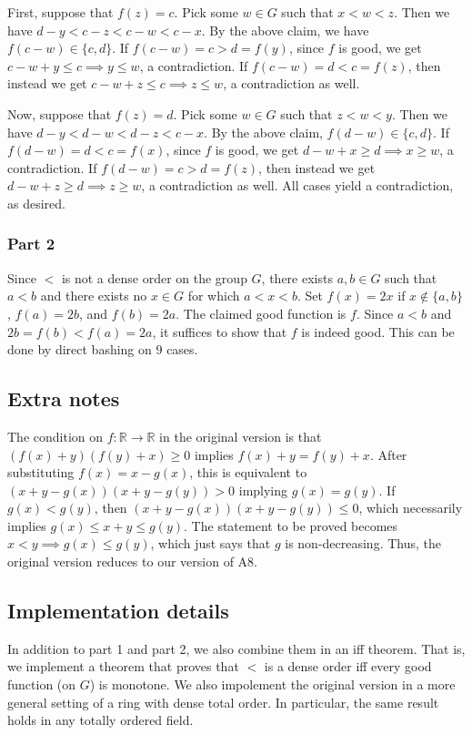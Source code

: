 \documentclass{article}
\newcommand{\R}{\mathbb{R}}
\begin{document}
First, suppose that $f(z) = c$.
Pick some $w \in G$ such that $x < w < z$.
Then we have $d - y < c - z < c - w < c - x$.
By the above claim, we have $f(c - w) \in \{c, d\}$.
If $f(c - w) = c > d = f(y)$, since $f$ is good, we get $c - w + y \leq c \implies y \leq w$, a contradiction.
If $f(c - w) = d < c = f(z)$, then instead we get $c - w + z \leq c \implies z \leq w$, a contradiction as well.

Now, suppose that $f(z) = d$.
Pick some $w \in G$ such that $z < w < y$.
Then we have $d - y < d - w < d - z < c - x$.
By the above claim, $f(d - w) \in \{c, d\}$.
If $f(d - w) = d < c = f(x)$, since $f$ is good, we get $d - w + x \geq d \implies x \geq w$, a contradiction.
If $f(d - w) = c > d = f(z)$, then instead we get $d - w + z \geq d \implies z \geq w$, a contradiction as well.
All cases yield a contradiction, as desired.


\subsubsection*{Part 2}

Since $<$ is not a dense order on the group $G$, there exists $a, b \in G$ such that $a < b$ and there exists no $x \in G$ for which $a < x < b$.
Set $f(x) = 2x$ if $x \notin \{a, b\}$, $f(a) = 2b$, and $f(b) = 2a$.
The claimed good function is $f$.
Since $a < b$ and $2b = f(b) < f(a) = 2a$, it suffices to show that $f$ is indeed good.
This can be done by direct bashing on 9 cases.



\subsection*{Extra notes}

The condition on $f : \R \to \R$ in the original version is that $(f(x) + y)(f(y) + x) \geq 0$ implies $f(x) + y = f(y) + x$.
After substituting $f(x) = x - g(x)$, this is equivalent to $(x + y - g(x))(x + y - g(y)) > 0$ implying $g(x) = g(y)$.
If $g(x) < g(y)$, then $(x + y - g(x))(x + y - g(y)) \leq 0$, which necessarily implies $g(x) \leq x + y \leq g(y)$.
The statement to be proved becomes $x < y \implies g(x) \leq g(y)$, which just says that $g$ is non-decreasing.
Thus, the original version reduces to our version of A8.



\subsection*{Implementation details}

In addition to part 1 and part 2, we also combine them in an iff theorem.
That is, we implement a theorem that proves that $<$ is a dense order iff every good function (on $G$) is monotone.
We also impolement the original version in a more general setting of a ring with dense total order.
In particular, the same result holds in any totally ordered field.
\end{document}
